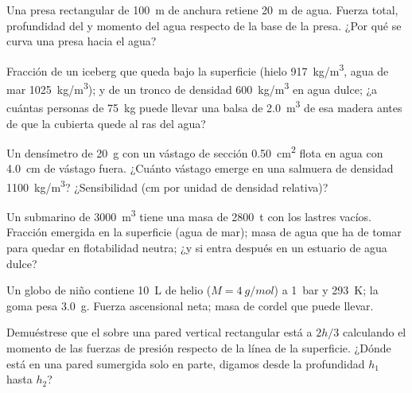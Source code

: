 \begin{exercise}[$\star\star$]\label{exo:b1:fluid-statics:6}
Una presa rectangular de \qty{100}{m} de anchura retiene \qty{20}{m} de
agua. Fuerza total, profundidad del  y momento del agua
respecto de la base de la presa. ¿Por qué se curva una presa hacia el agua?
\end{exercise}

\begin{exercise}[$\star\star$]\label{exo:b1:fluid-statics:7}
Fracción de un iceberg que queda bajo la superficie (hielo \qty{917}{kg/m^3},
agua de mar \qty{1025}{kg/m^3}); y de un tronco de densidad
\qty{600}{kg/m^3} en agua dulce; ¿a cuántas personas de \qty{75}{kg} puede
llevar una balsa de \qty{2.0}{m^3} de esa madera antes de que la cubierta
quede al ras del agua?
\end{exercise}

\begin{exercise}[$\star\star$]\label{exo:b1:fluid-statics:8}
Un densímetro de \qty{20}{g} con un vástago de sección \qty{0.50}{cm^2}
flota en agua con \qty{4.0}{cm} de vástago fuera. ¿Cuánto vástago emerge en
una salmuera de densidad \qty{1100}{kg/m^3}? ¿Sensibilidad (cm por unidad
de densidad relativa)?
\end{exercise}

\begin{exercise}[$\star\star$]\label{exo:b1:fluid-statics:9}
Un submarino de \qty{3000}{m^3} tiene una masa de \qty{2800}{t} con los
lastres vacíos. Fracción emergida en la superficie (agua de mar); masa de
agua que ha de tomar para quedar en flotabilidad neutra; ¿y si entra
después en un estuario de agua dulce?
\end{exercise}

\begin{exercise}[$\star\star\star$]\label{exo:b1:fluid-statics:10}
Un globo de niño contiene \qty{10}{L} de helio ($M = \qty{4}{g/mol}$) a
\qty{1}{bar} y \qty{293}{K}; la goma pesa \qty{3.0}{g}. Fuerza ascensional
neta; masa de cordel que puede llevar.
\end{exercise}

\begin{exercise}[$\star\star\star$]\label{exo:b1:fluid-statics:11}
Demuéstrese que el  sobre una pared vertical rectangular
está a $2h/3$ calculando el momento de las fuerzas de presión respecto de
la línea de la superficie. ¿Dónde está en una pared sumergida solo en
parte, digamos desde la profundidad $h_1$ hasta $h_2$?
\end{exercise}

